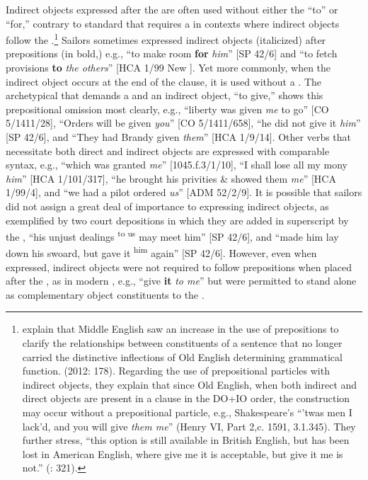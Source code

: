Indirect objects expressed after the  are often used without either the  “to” or “for,” contrary to standard  that requires a  in contexts where indirect objects follow the .\footnote{\citeauthor{MillwardHayes2012} explain that Middle English saw an increase in the use of prepositions to clarify the relationships between constituents of a sentence that no longer carried the distinctive inflections of Old English determining grammatical function. (2012: 178). Regarding the use of prepositional particles with indirect objects, they explain that since Old English, when both indirect and direct objects are present in a clause in the DO+IO order, the construction may occur without a prepositional particle, e.g., Shakespeare’s “’twas men I lack’d, and you will give \textit{them me}” (Henry VI, Part 2,c. 1591, 3.1.345). They further stress, “this option is still available in British English, but has been lost in American English, where give me it is acceptable, but give it me is not.” (\citealt{MillwardHayes2012}: 321).} Sailors sometimes expressed indirect objects (italicized) after prepositions (in bold,) e.g., “to make room \textbf{for} \textit{him}” [SP 42/6] and “to fetch provisions \textbf{to} \textit{the others}” [HCA 1/99 New \citealt{Providence1722}]. Yet more commonly, when the indirect object occurs at the end of the clause, it is used without a . The archetypical  that demands a  and an indirect object, “to give,” shows this prepositional omission most clearly, e.g., “liberty was given \textit{me} to go” [CO 5/1411/28], “Orders will be given \textit{you}” [CO 5/1411/658], “he did not give it \textit{him}” [SP 42/6], and “They had Brandy given \textit{them}” [HCA 1/9/14]. Other verbs that necessitate both direct and indirect objects are expressed with comparable syntax, e.g., “which was granted \textit{me}” [1045.f.3/1/10], “I shall lose all my mony \textit{him}” [HCA 1/101/317], “he brought his privities \& showed them \textit{me}” [HCA 1/99/4], and “we had a pilot ordered \textit{us}” [ADM 52/2/9]. It is possible that sailors did not assign a great deal of importance to expressing indirect objects, as exemplified by two court depositions in which they are added in superscript by the , “his unjust dealings \textsuperscript{to us} may meet him” [SP 42/6], and “made him lay down his swoard, but gave it \textsuperscript{him} again” [SP 42/6]. However, even when expressed, indirect objects were not required to follow prepositions when placed after the , as in modern , e.g., “give \textbf{it} \textit{to me}” but were permitted to stand alone as complementary object constituents to the . 

